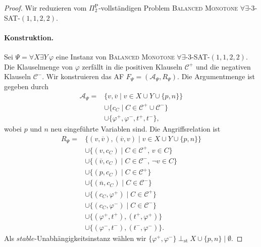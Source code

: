 \begin{proof}
    Wir reduzieren vom \(\Pi_2^{\mathrm{P}}\)-vollständigen Problem
    \textsc{Balanced Monotone \(\forall\exists\)-3-SAT-\((1,1,2,2)\)}.

    \paragraph{Konstruktion.}
Sei
\(
    \Psi=\forall X\exists Y\,\varphi
\)
eine Instanz von \textsc{Balanced Monotone \(\forall\exists\)-3-SAT-\((1,1,2,2)\)}.
Die Klauselmenge von \(\varphi\) zerfällt in die positiven Klauseln
\(\mathcal{C}^{+}\) und die negativen Klauseln \(\mathcal{C}^{-}\).
Wir konstruieren das AF
\(
    F_{\Psi}=(\mathcal{A}_{\Psi},R_{\Psi}).
\)
Die Argumentmenge ist gegeben durch
\[
\begin{aligned}
    \mathcal{A}_{\Psi}
    ={}&
    \{v,\overline{v}\mid v\in X\cup Y\cup\{p,n\}\}\\
    &\cup
    \{c_C\mid C\in\mathcal{C}^{+}\cup\mathcal{C}^{-}\}\\
    &\cup
    \{\varphi^{+},\varphi^{-},t^{+},t^{-}\},
\end{aligned}
\]
wobei \(p\) und \(n\) neu eingeführte Variablen sind.
Die Angriffsrelation ist
\[
\begin{aligned}
    R_{\Psi}
    ={}&
    \{(v,\overline{v}),(\overline{v},v)
        \mid v\in X\cup Y\cup\{p,n\}\}\\
    &\cup
    \{(v,c_C)
        \mid C\in\mathcal{C}^{+},\,v\in C\}\\
    &\cup
    \{(\overline{v},c_C)
        \mid C\in\mathcal{C}^{-},\,\neg v\in C\}\\
    &\cup
    \{(p,c_C)\mid C\in\mathcal{C}^{+}\}\\
    &\cup
    \{(\overline{n},c_C)\mid C\in\mathcal{C}^{-}\}\\
    &\cup
    \{(c_C,\varphi^{+})\mid C\in\mathcal{C}^{+}\}\\
    &\cup
    \{(c_C,\varphi^{-})\mid C\in\mathcal{C}^{-}\}\\
    &\cup
    \{(\varphi^{+},t^{+}),(t^{+},\varphi^{+})\}\\
    &\cup
    \{(\varphi^{-},t^{-}),(t^{-},\varphi^{-})\}.
\end{aligned}
\]
Als \(stable\)-Unabhängigkeitsinstanz wählen wir
\(\{\varphi^{+},\varphi^{-}\} \perp_{\mathrm{st}} X \cup \{p,n\} \mid \emptyset\).


\end{proof}

